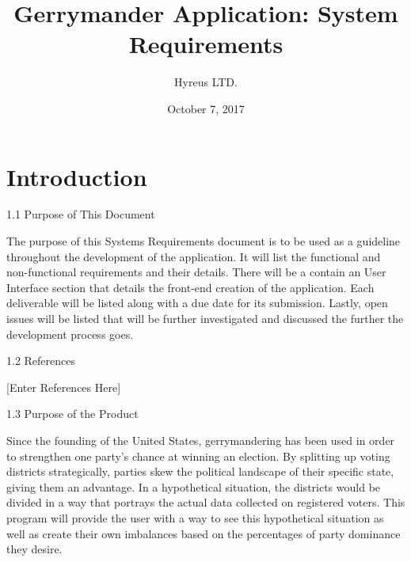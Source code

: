 \documentclass{article}
\begin{document}
\begin{titlepage}
	\title{Gerrymander Application: System Requirements}
	\author{Hyreus LTD.}
	\date{October 7, 2017}
	\maketitle
\end{titlepage}



\section{Introduction}\label{sec:intro}

1.1 Purpose of This Document

\vspace{2.5mm}

\begin{addmargin}[4em]{0em}

The purpose of this Systems Requirements document is to be used as a guideline throughout the development of the application. It will list the functional and non-functional requirements and their details. There will be a contain an User Interface section that details the front-end creation of the application. Each deliverable will be listed along with a due date for its submission. Lastly, open issues will be listed that will be further investigated and discussed the further the development process goes.

\end{addmargin}

\vspace{2.5mm}

1.2 References

\vspace{2.5mm}

\begin{addmargin}[4em]{0em}

[Enter References Here]

\end{addmargin}

\vspace{2.5mm}

1.3 Purpose of the Product

\vspace{2.5mm}

\begin{addmargin}[4em]{0em}

Since the founding of the United States, gerrymandering has been used in order to strengthen one party's chance at winning an election. By splitting up voting districts strategically, parties skew the political landscape of their specific state, giving them an advantage. In a hypothetical situation, the districts would be divided in a way that portrays the actual data collected on registered voters. This program will provide the user with a way to see this hypothetical situation as well as create their own imbalances based on the percentages of party dominance they desire.

\vspace{2.5mm}

\end{addmargin}
\end{document}
